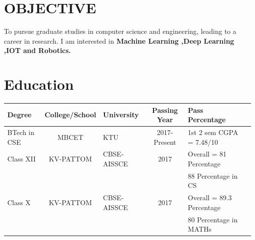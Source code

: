 \documentclass[margin,line]{res}
\begin{document}
\begin{resume}
\begin{tabular}{@{}p{3.5in}p{3in}}
		\end{tabular}
		
		\vspace{.1in}
	\section{\sc OBJECTIVE}

To pursue graduate studies in computer science and engineering, leading to a career in research. I am interested in \bf Machine Learning ,Deep Learning ,IOT and Robotics. 

\vspace{.1in}
\section{\sc Education}
\begin{tabular}{|l|c|l|c|l|c|}\hline
	\bf Degree&\bf College/School&\bf University&\bf Passing Year&\bf Pass Percentage \\ \hline
	BTech in CSE
	&MBCET & KTU & 2017-Present&1st 2 sem CGPA = 7.48/10 \\ \hline
	Class XII
	&KV-PATTOM & CBSE-AISSCE  & 2017& Overall = 81 Percentage \\&&&&88 Percentage in CS 
	
	\\ \hline
	Class X
	&KV-PATTOM & CBSE-AISSCE  & 2017& Overall = 89.3 Percentage \\&&&&80 Percentage in MATHs 
	
	\\ \hline
\end{tabular}	

\end{resume}
\end{document}
